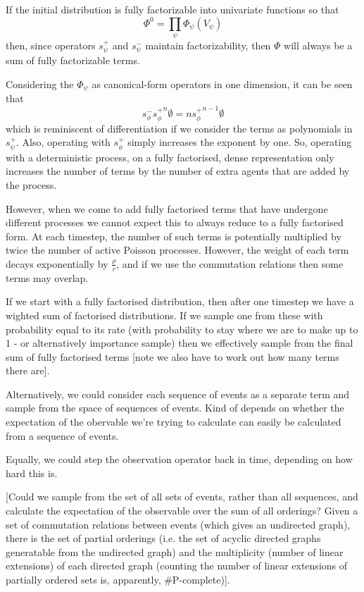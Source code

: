 \documentclass[a4paper]{article}
\begin{document}
If the initial distribution is fully factorizable into univariate functions so that
\[
\Phi^0 = \prod_\psi \Phi_\psi(V_\psi)
\]
then, since operators $s^+_\psi$ and $s^-_\psi$ maintain factorizability, then $\Phi$ will always be a sum of fully factorizable terms. 

Considering the $\Phi_\psi$ as canonical-form operators in one dimension, it can be seen that
\[
s^-_\phi \left.s^+_\phi\right.^n\emptyset = n \left.s^+_\phi\right.^{n-1}\emptyset
\]
which is reminiscent of differentiation if we consider the terms as polynomials in $s^+_\psi$. Also, operating with $s^+_\phi$ simply increases the exponent by one. So, operating with a deterministic process, on a fully factorised, dense representation only increases the number of terms by the number of extra agents that are added by the process.

However, when we come to add fully factorised terms that have undergone different processes we cannot expect this to always reduce to a fully factorised form. At each timestep, the number of such terms is potentially multiplied by twice the number of active Poisson processes. However, the weight of each term decays exponentially by $\frac{\rho}{r}$, and if we use the commutation relations then some terms may overlap.

If we start with a fully factorised distribution, then after one timestep we have a wighted sum of factorised distributions. If we sample one from these with probability equal to its rate (with probability to stay where we are to make up to 1 - or alternatively importance sample) then we effectively sample from the final sum of fully factorised terms [note we also have to work out how many terms there are].

Alternatively, we could consider each sequence of events as a separate term and sample from the space of sequences of events. Kind of depends on whether the expectation of the obervable we're trying to calculate can easily be calculated from a sequence of events.

Equally, we could step the observation operator back in time, depending on how hard this is.

[Could we sample from the set of all sets of events, rather than all sequences, and calculate the expectation of the observable over the sum of all orderings? Given a set of commutation relations between events (which gives an undirected graph), there is the set of partial orderings (i.e. the set of acyclic directed graphs generatable from the undirected graph) and the multiplicity (number of linear extensions) of each directed graph (counting the number of linear extensions of partially ordered sets is, apparently, \#P-complete)].
\end{document}
